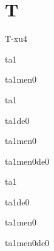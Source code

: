 \section*{T}
\begin{multicols}{2}

\begin{verbete}[T-恤]{T-xu4}
\end{verbete}

\begin{verbete}[它]{ta1}
\end{verbete}

\begin{verbete}[它们]{ta1men0}
\end{verbete}

\begin{verbete}[他]{ta1}
\end{verbete}

\begin{verbete}[他的]{ta1de0}
\end{verbete}

\begin{verbete}[他们]{ta1men0}
\end{verbete}

\begin{verbete}[他们的]{ta1men0de0}
\end{verbete}

\begin{verbete}[她]{ta1}
\end{verbete}

\begin{verbete}[她的]{ta1de0}
\end{verbete}

\begin{verbete}[她们]{ta1men0}
\end{verbete}

\begin{verbete}[她们的]{ta1men0de0}
\end{verbete}


\end{multicols}
